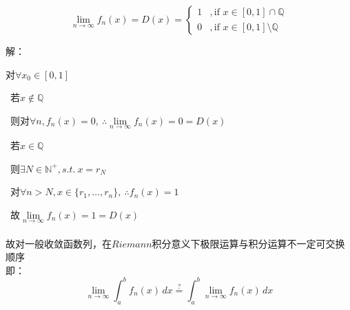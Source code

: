 \begin{eg}
\[ \lim_{n \to \infty} f_{n}(x) = D(x) = 
\begin{cases} 
    1 & ,\text{if } x \in  [0,1] \cap \mathbb{Q} \\ 
    0 & ,\text{if } x \in [0,1]\setminus \mathbb{Q} 
\end{cases} \]
\end{eg}
\noindent 解：
\par
对$\forall x_{0} \in [0,1]$
\par
{} \ 若$x\notin \mathbb{Q} $
\par
\quad \ 则对$\forall n , f_{n}(x) = 0 , \ \therefore \lim \limits_{n \to \infty}f_{n}(x) = 0 = D(x)$
\par
{} \ 若$x\in \mathbb{Q} $
\par
\quad \ 则$\exists N \in \mathbb{N} ^{+} , s.t. \ x = r_{N}$
\par
\quad \ 对$\forall n > N , x \in \{r_{1},\dots,r_{n}\} , \ \therefore f_{n}(x) = 1$
\par
\quad \ 故$\lim \limits_{n \to \infty}f_{n}(x) = 1 = D(x)$
\\ \hspace*{\fill}\\
故对一般收敛函数列，在$Riemann$积分意义下极限运算与积分运算不一定可交换顺序
\\
即：
\[\lim_{n \to \infty} \int_{a}^{b} f_{n}(x) \,dx \stackrel{?}{=} \int_{a}^{b} \lim_{n \to \infty}  f_{n}(x) \,dx   \]

